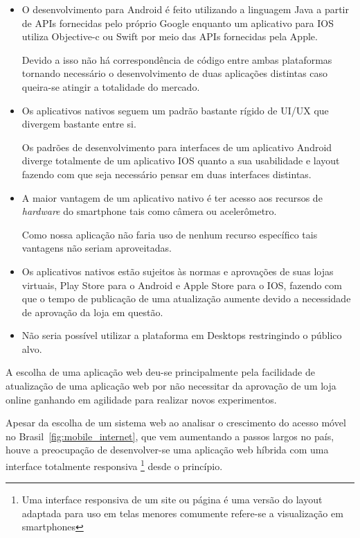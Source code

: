 \begin{itemize}
\item O desenvolvimento para Android é feito utilizando a linguagem Java a partir de APIs fornecidas pelo próprio Google enquanto um aplicativo para IOS utiliza Objective-c ou Swift por meio das APIs fornecidas pela Apple.
\par Devido a isso não há correspondência de código entre ambas plataformas tornando necessário o desenvolvimento de duas aplicações distintas caso queira-se atingir a totalidade do mercado.
\item Os aplicativos nativos seguem um padrão bastante rígido de UI/UX que divergem bastante entre si.
\par Os padrões de desenvolvimento para interfaces de um aplicativo Android diverge totalmente de um aplicativo IOS quanto a sua usabilidade e layout fazendo com que seja necessário pensar em duas interfaces distintas.
\item A maior vantagem de um aplicativo nativo é ter acesso aos recursos de \emph{hardware} do smartphone tais como câmera ou acelerômetro.
\par Como nossa aplicação não faria uso de nenhum recurso específico tais vantagens não seriam aproveitadas.
\item Os aplicativos nativos estão sujeitos às normas e aprovações de suas lojas virtuais, Play Store para o Android e Apple Store para o IOS, fazendo com que o tempo de publicação de uma atualização aumente devido a necessidade de aprovação da loja em questão.
\item Não seria possível utilizar a plataforma em Desktops restringindo o público alvo.
\end{itemize}
\par A escolha de uma aplicação web deu-se principalmente pela facilidade de atualização de uma aplicação web por não necessitar da aprovação de um loja online ganhando em agilidade para realizar novos experimentos.
\par Apesar da escolha de um sistema web ao analisar o crescimento do acesso móvel no Brasil~\ref{fig:mobile_internet}, que vem aumentando a passos largos no país, houve a preocupação de desenvolver-se uma aplicação web híbrida com uma interface totalmente responsiva \footnote{ Uma interface responsiva de um site ou página é uma versão do layout adaptada para uso em telas menores comumente refere-se a visualização em smartphones} desde o princípio.
